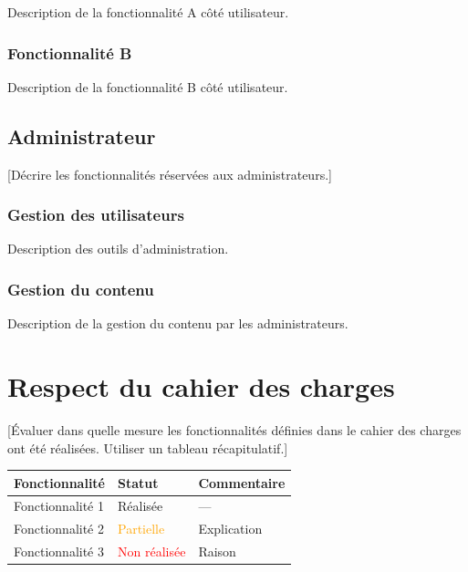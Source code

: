 \documentclass[12pt, a4paper]{article}
\begin{document}
Description de la fonctionnalité A côté utilisateur.

\subsubsection{Fonctionnalité B}

Description de la fonctionnalité B côté utilisateur.

\subsection{Administrateur}

[Décrire les fonctionnalités réservées aux administrateurs.]

\subsubsection{Gestion des utilisateurs}

Description des outils d'administration.

\subsubsection{Gestion du contenu}

Description de la gestion du contenu par les administrateurs.

\section{Respect du cahier des charges}

[Évaluer dans quelle mesure les fonctionnalités définies dans le cahier des
charges ont été réalisées. Utiliser un tableau récapitulatif.]

\begin{center}
\begin{tabular}{|L{6cm}|C{2.5cm}|L{4cm}|}
  \hline
  \color{white}\textbf{Fonctionnalité} &
  \color{white}\textbf{Statut} &
  \color{white}\textbf{Commentaire} \\
  \hline
  Fonctionnalité 1 & \textcolor{green!60!black}{Réalisée} & --- \\
  \hline
  Fonctionnalité 2 & \textcolor{orange}{Partielle} & Explication \\
  \hline
  Fonctionnalité 3 & \textcolor{red}{Non réalisée} & Raison \\
  \hline
\end{tabular}
\end{center}
\end{document}
